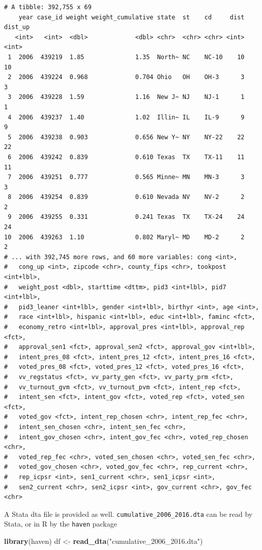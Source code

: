 \documentclass[10pt,article,oneside]{memoir}
\theoremstyle{definition}
\newenvironment{Shaded}{\begin{snugshade}}{\end{snugshade}}
\newcommand{\KeywordTok}[1]{\textcolor[rgb]{0.13,0.29,0.53}{\textbf{#1}}}
\newcommand{\StringTok}[1]{\textcolor[rgb]{0.31,0.60,0.02}{#1}}
\newcommand{\NormalTok}[1]{#1}
\begin{document}
\begin{verbatim}
# A tibble: 392,755 x 69
    year case_id weight weight_cumulative state  st    cd     dist dist_up
   <int>   <int>  <dbl>             <dbl> <chr>  <chr> <chr> <int>   <int>
 1  2006  439219  1.85              1.35  North~ NC    NC-10    10      10
 2  2006  439224  0.968             0.704 Ohio   OH    OH-3      3       3
 3  2006  439228  1.59              1.16  New J~ NJ    NJ-1      1       1
 4  2006  439237  1.40              1.02  Illin~ IL    IL-9      9       9
 5  2006  439238  0.903             0.656 New Y~ NY    NY-22    22      22
 6  2006  439242  0.839             0.610 Texas  TX    TX-11    11      11
 7  2006  439251  0.777             0.565 Minne~ MN    MN-3      3       3
 8  2006  439254  0.839             0.610 Nevada NV    NV-2      2       2
 9  2006  439255  0.331             0.241 Texas  TX    TX-24    24      24
10  2006  439263  1.10              0.802 Maryl~ MD    MD-2      2       2
# ... with 392,745 more rows, and 60 more variables: cong <int>,
#   cong_up <int>, zipcode <chr>, county_fips <chr>, tookpost <int+lbl>,
#   weight_post <dbl>, starttime <dttm>, pid3 <int+lbl>, pid7 <int+lbl>,
#   pid3_leaner <int+lbl>, gender <int+lbl>, birthyr <int>, age <int>,
#   race <int+lbl>, hispanic <int+lbl>, educ <int+lbl>, faminc <fct>,
#   economy_retro <int+lbl>, approval_pres <int+lbl>, approval_rep <fct>,
#   approval_sen1 <fct>, approval_sen2 <fct>, approval_gov <int+lbl>,
#   intent_pres_08 <fct>, intent_pres_12 <fct>, intent_pres_16 <fct>,
#   voted_pres_08 <fct>, voted_pres_12 <fct>, voted_pres_16 <fct>,
#   vv_regstatus <fct>, vv_party_gen <fct>, vv_party_prm <fct>,
#   vv_turnout_gvm <fct>, vv_turnout_pvm <fct>, intent_rep <fct>,
#   intent_sen <fct>, intent_gov <fct>, voted_rep <fct>, voted_sen <fct>,
#   voted_gov <fct>, intent_rep_chosen <chr>, intent_rep_fec <chr>,
#   intent_sen_chosen <chr>, intent_sen_fec <chr>,
#   intent_gov_chosen <chr>, intent_gov_fec <chr>, voted_rep_chosen <chr>,
#   voted_rep_fec <chr>, voted_sen_chosen <chr>, voted_sen_fec <chr>,
#   voted_gov_chosen <chr>, voted_gov_fec <chr>, rep_current <chr>,
#   rep_icpsr <int>, sen1_current <chr>, sen1_icpsr <int>,
#   sen2_current <chr>, sen2_icpsr <int>, gov_current <chr>, gov_fec <chr>
\end{verbatim}

A Stata dta file is provided as well.
\texttt{cumulative\_2006\_2016.dta} can be read by Stata, or in R by the
\texttt{haven} package

\begin{Shaded}
\begin{Highlighting}[]
\KeywordTok{library}\NormalTok{(haven)}
\NormalTok{df <-}\StringTok{ }\KeywordTok{read_dta}\NormalTok{(}\StringTok{"cumulative_2006_2016.dta"}\NormalTok{)}
\end{Highlighting}
\end{Shaded}
\end{document}
